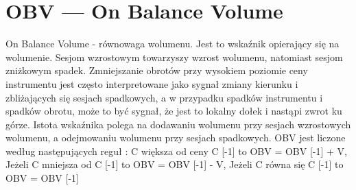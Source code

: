 \section{OBV --- On Balance Volume}
\label{sec:1OBV}

On Balance Volume - równowaga wolumenu. Jest to wskaźnik opierający się na wolumenie. Sesjom wzrostowym towarzyszy wzrost wolumenu, natomiast sesjom zniżkowym spadek. Zmniejszanie obrotów przy wysokiem poziomie ceny instrumentu jest często interpretowane jako sygnał zmiany kierunku i zbliżających się sesjach spadkowych, a w przypadku spadków instrumentu i spadków obrotu, może to być sygnał, że jest to lokalny dołek i nastąpi zwrot ku górze. Istota wskaźnika polega na dodawaniu wolumenu przy sesjach wzrostowych wolumenu, a odejmowaniu wolumenu przy sesjach spadkowych.  OBV jest liczone według następujących reguł   : C  większa od ceny C [-1] to OBV = OBV [-1] + V, Jeżeli C mniejsza od C [-1] to OBV = OBV [-1] - V, Jeżeli C równa się C [-1] to OBV = OBV [-1]



\noindent

